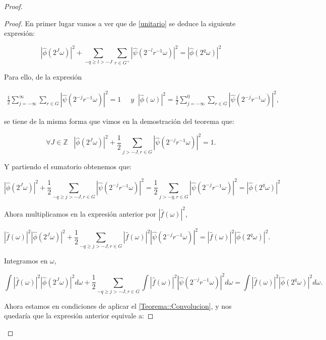 \begin{proof}
\begin{proof}
  \noindent En primer lugar vamos a ver que de \autoref{unitario} se deduce la siguiente expresión: 

  $$|\widehat{\phi}(2^J \omega)|^2 + \sum_{-q\geq l > -J} \sum_{r \in G^+}|\widehat{\psi}(2^{-l}r^{-1} \omega)|^2=|\widehat{\phi}(2^q \omega) |^2$$

  \noindent Para ello, de la expresión

  \begin{align*}
    \frac{1}{2} \sum_{j=-\infty}^\infty \sum_{r \in G} |\widehat{\psi}(2^{-j}r^{-1}\omega)|^2=1 & \; \; y
    \;\;|\widehat{\phi}(\omega)|^2= \frac{1}{2} \sum_{j=-\infty}^0 \sum_{r\in G} |\widehat{\psi}(2^{-j}r^{-1}\omega)|^2,
  \end{align*}

  \noindent se tiene de la misma forma que vimos en la demostración del teorema que:

  $$\forall J \in \mathbb{Z} \; \; \; \left|\widehat{\phi}\left(2^J\omega\right)\right|^2 + \frac{1}{2} \sum_{j>-J,r\in G}\left|\widehat{\psi}\left(2^{-j}r^{-1}\omega\right)\right|^2=1. $$

  \noindent Y partiendo el sumatorio obtenemos que: 

  $$\left|\widehat{\phi}\left(2^J\omega\right)\right|^2 + \frac{1}{2}  \sum_{-q \geq j >-J,r \in G}\left|\widehat{\psi}\left(2^{-j}r^{-1}\omega\right)\right|^2= \frac{1}{2} \sum_{j>-q,r \in G}\left|\widehat{\psi}\left(2^{-j}r^{-1}\omega\right)\right|^2=|\widehat{\phi}(2^q \omega)|^2$$
  
  \noindent Ahora multiplicamos en la expresión anterior por $|\widehat{f}(\omega)|^2$, 
  
  $$\left|\widehat{f}(\omega)\right|^2 \left|\widehat{\phi}\left(2^J\omega\right)\right|^2 + \frac{1}{2} \sum_{-q \geq j >-J,r \in G} \left|\widehat{f}(\omega)\right|^2 \left|\widehat{\psi}\left(2^{-j}r^{-1}\omega\right)\right|^2=\left|\widehat{f}(\omega)\right|^2 \left|\widehat{\phi}(2^q \omega)\right|^2.$$

  \noindent Integramos en $\omega$, 

  $$\int \left|\widehat{f}(\omega)\right|^2 \left|\widehat{\phi}\left(2^J\omega\right)\right|^2 d\omega + \frac{1}{2} \sum_{-q \geq j >-J,r \in G} \int \left|\widehat{f}(\omega)\right|^2 \left|\widehat{\psi}\left(2^{-j}r^{-1}\omega\right)\right|^2 d\omega=\int \left|\widehat{f}(\omega)\right|^2 \left|\widehat{\phi}(2^q \omega)\right|^2 d\omega.$$

  \noindent Ahora estamos en condiciones de aplicar el \autoref{Teorema::Convolucion}, y nos quedaría que la expresión anterior equivale a: 


\end{proof}
\end{proof}
